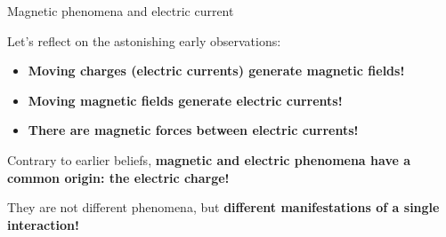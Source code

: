 \begin{frame}{Magnetic phenomena and electric current}

Let's reflect on the astonishing early observations:

\begin{itemize}
    \item
       {\bf Moving charges (electric currents) generate magnetic fields!}
    \vspace{0.2cm}
    \item
       {\bf Moving magnetic fields generate electric currents!}
    \vspace{0.2cm}
    \item
       {\bf There are magnetic forces between electric currents!}
    \vspace{0.2cm}
\end{itemize}

\vspace{0.4cm}

Contrary to earlier beliefs, {\bf magnetic and electric phenomena
have a common origin: the electric charge!}\\

\vspace{0.2cm}

They are not different phenomena, but {\bf different manifestations of a
single interaction!}\\

\end{frame}


%
%
%

